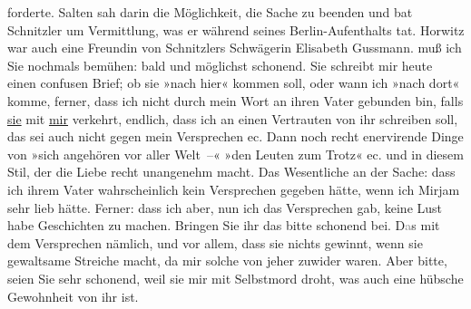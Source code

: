 \begin{ledgroupsized}[t]{13cm}
{{{                  forderte. Salten sah darin die Möglichkeit, die Sache zu beenden
                  und bat Schnitzler um Vermittlung, was er während seines Berlin-Aufenthalts tat. Horwitz war
                  auch eine Freundin von Schnitzlers Schwägerin Elisabeth Gussmann.}}}\label{K_L03339-3h} muß ich Sie
               nochmals bemühen: bald und möglichst schonend. Sie schreibt mir heute einen confusen Brief; ob sie »nach hier« kommen
               soll, oder wann ich »nach dort« komme, ferner, dass ich nicht durch mein Wort an
               ihren Vater gebunden bin,
               falls \uline{sie} mit \uline{mir}
               verkehrt, endlich, dass ich an einen Vertrauten von ihr schreiben soll, das sei auch
               nicht gegen mein Versprechen ec. Dann noch recht enervirende Dinge
               von »sich angehören vor aller {\pb}Welt –« »den Leuten zum Trotz« ec. und in diesem Stil, der die Liebe recht
               unangenehm macht.\pend
           \pstart
           Das Wesentliche an der Sache: dass ich ihrem Vater wahrscheinlich kein Versprechen gegeben hätte, wenn
               ich Mirjam sehr lieb hätte. Ferner: dass ich
               aber, nun ich das Versprechen gab, keine Lust habe Geschichten zu machen. Bringen Sie
               ihr das bitte schonend bei. D\textcolor{gray}{a}s mit dem Versprechen nämlich, und
               vor allem, dass sie nichts gewinnt, wenn sie gewaltsame Streiche macht, da mir solche
               von jeher zuwider waren. Aber bitte, seien Sie sehr schonend, weil sie mir mit
               Selbstmord droht, was auch eine hübsche Gewohnheit von ihr ist.\pend
           \pstart

\end{ledgroupsized}
